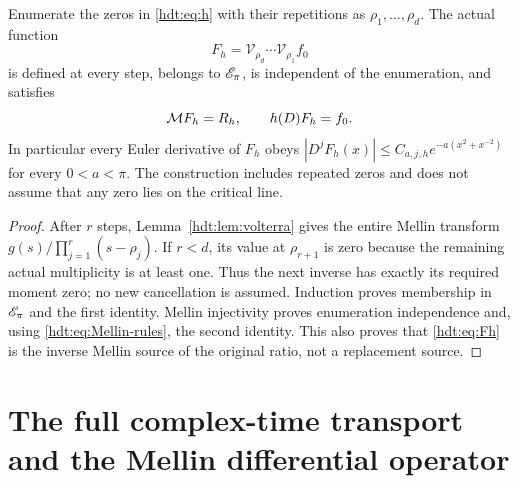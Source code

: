 \documentclass[11pt]{article}
\begin{document}
\begin{hdttheorem}
\label{hdt:thm:divisor}
Enumerate the zeros in \eqref{hdt:eq:h} with their repetitions as
$\rho_1,\ldots,\rho_d$. The actual function
\begin{equation}\label{hdt:eq:Fh}
F_h=\mathcal V_{\rho_d}\cdots\mathcal V_{\rho_1}f_0
\end{equation}
is defined at every step, belongs to $\mathscr E_\pi$, is independent of the
enumeration, and satisfies
\begin{equation}\label{hdt:eq:Fh-identities}
\mathcal M F_h=R_h,\qquad h(D)F_h=f_0.
\end{equation}
In particular every Euler derivative of $F_h$ obeys
$|D^jF_h(x)|\leq C_{a,j,h}e^{-a(x^2+x^{-2})}$ for every
$0<a<\pi$. The construction includes repeated zeros and does not
assume that any zero lies on the critical line.
\end{hdttheorem}
\begin{proof}
After $r$ steps, Lemma~\ref{hdt:lem:volterra} gives the entire Mellin
transform $g(s)/\prod_{j=1}^r(s-\rho_j)$. If $r<d$, its value at
$\rho_{r+1}$ is zero because the remaining actual multiplicity is
at least one. Thus the next inverse has exactly its required moment
zero; no new cancellation is assumed. Induction proves membership
in $\mathscr E_\pi$ and the first identity. Mellin injectivity proves
enumeration independence and, using \eqref{hdt:eq:Mellin-rules}, the
second identity. This also proves that \eqref{hdt:eq:Fh} is the inverse
Mellin source of the original ratio, not a replacement source.
\end{proof}

\section{The full complex-time transport and the Mellin differential operator}
\end{document}
